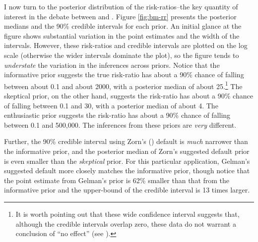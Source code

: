 \documentclass[12pt]{article}
\begin{document}
I now turn to the posterior distribution of the risk-ratios--the key quantity of interest in the debate between \cite{BellMiller2015} and \cite{Rauchhaus2009}. Figure \ref{fig:bm-rr} presents the posterior medians and the 90\% credible intervals for each prior. An initial glance at the figure shows substantial variation in the point estimates and the width of the intervals. However, these risk-ratios and credible intervals are plotted on the log scale (otherwise the wider intervals dominate the plot), so the figure tends to \textit{understate }the variation in the inferences across priors. Notice that the informative prior suggests the true risk-ratio has about a 90\% chance of falling between about 0.1 and about 2000, with a posterior median of about 25.\footnote{It is worth pointing out that these wide confidence interval suggests that, although the credible intervals overlap zero, these data do not warrant a conclusion of ``no effect'' (see \citealt{Rainey2014}).} The skeptical prior, on the other hand, suggests the risk-ratio has about a 90\% chance of falling between 0.1 and 30, with a posterior median of about 4. The enthusiastic prior suggests the risk-ratio has about a 90\% chance of falling between 0.1 and 500,000. The inferences from these priors are \emph{very} different. 

Further, the 90\% credible interval using Zorn's (\citeyear{Zorn2005}) default is \emph{much} narrower than the informative prior, and the posterior median of Zorn's suggested default prior is even smaller than the \emph{skeptical} prior. For this particular application, Gelman's suggested default more closely matches the informative prior, though notice that the point estimate from Gelman's prior is 62\% smaller than that from the informative prior and the upper-bound of the credible interval is 13 times larger.
\end{document}
